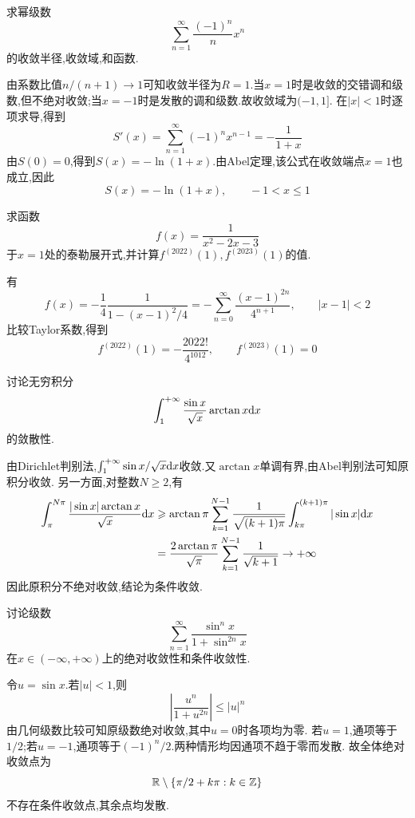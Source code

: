 \documentclass{ctexart}
\begin{document}
\begin{problem}[3.(15\songti{分})]
求幂级数
        \[\sum_{n=1}^{\infty}\dfrac{(-1)^n}{n}x^n\]
        的收敛半径,收敛域,和函数.
\end{problem}
\begin{solution}
由系数比值$n/(n+1)\to1$可知收敛半径为$R=1$.当$x=1$时是收敛的交错调和级数,但不绝对收敛;当$x=-1$时是发散的调和级数.故收敛域为$(-1,1]$.
在$|x|<1$时逐项求导,得到
\[S'(x)=\sum_{n=1}^{\infty}(-1)^nx^{n-1}=-\frac1{1+x}\]
由$S(0)=0$,得到$S(x)=-\ln(1+x)$.由Abel定理,该公式在收敛端点$x=1$也成立,因此
\[S(x)=-\ln(1+x),\qquad -1<x\leqslant1\]
\end{solution}

\begin{problem}[4.(10\songti{分})]
求函数
        \[f(x)=\dfrac{1}{x^2-2x-3}\]
        于$x=1$处的泰勒展开式,并计算$f^{(2022)}(1),f^{(2023)}(1)$的值.
\end{problem}
\begin{solution}
有
\[f(x)=-\frac14\frac1{1-(x-1)^2/4}
=-\sum_{n=0}^{\infty}\frac{(x-1)^{2n}}{4^{n+1}},\qquad |x-1|<2\]
比较Taylor系数,得到
\[f^{(2022)}(1)=-\frac{2022!}{4^{1012}},\qquad f^{(2023)}(1)=0\]
\end{solution}

\begin{problem}[5.(10\songti{分})]
讨论无穷积分
        \[\int_1^{+\infty}\dfrac{\sin x}{\sqrt{x}}\arctan x\mathrm{d} x\]
        的敛散性.
\end{problem}
\begin{solution}
由Dirichlet判别法,$\int_1^{+\infty}\sin x/\sqrt x\mathrm{d} x$收敛.又$\arctan x$单调有界,由Abel判别法可知原积分收敛.
另一方面,对整数$N\geqslant2$,有
\[\begin{aligned}
\int_\pi^{N\pi}\frac{|\sin x|\arctan x}{\sqrt x}\mathrm{d} x
&\geqslant\arctan\pi\sum_{k=1}^{N-1}\frac1{\sqrt{(k+1)\pi}}
\int_{k\pi}^{(k+1)\pi}|\sin x|\mathrm{d} x\\
&=\frac{2\arctan\pi}{\sqrt\pi}\sum_{k=1}^{N-1}\frac1{\sqrt{k+1}}\to+\infty
\end{aligned}\]
因此原积分不绝对收敛,结论为条件收敛.
\end{solution}

\begin{problem}[6.(10\songti{分})]
讨论级数
        \[\sum_{n=1}^{\infty}\dfrac{\sin^n x}{1+\sin^{2n}x}\]
        在$x\in(-\infty,+\infty)$上的绝对收敛性和条件收敛性.
\end{problem}
\begin{solution}
令$u=\sin x$.若$|u|<1$,则
\[\left|\frac{u^n}{1+u^{2n}}\right|\leqslant|u|^n\]
由几何级数比较可知原级数绝对收敛,其中$u=0$时各项均为零.
若$u=1$,通项等于$1/2$;若$u=-1$,通项等于$(-1)^n/2$.两种情形均因通项不趋于零而发散.
故全体绝对收敛点为
\[\mathbb{R}\setminus\{\pi/2+k\pi:k\in\mathbb Z\}\]
不存在条件收敛点,其余点均发散.
\end{solution}
\end{document}
